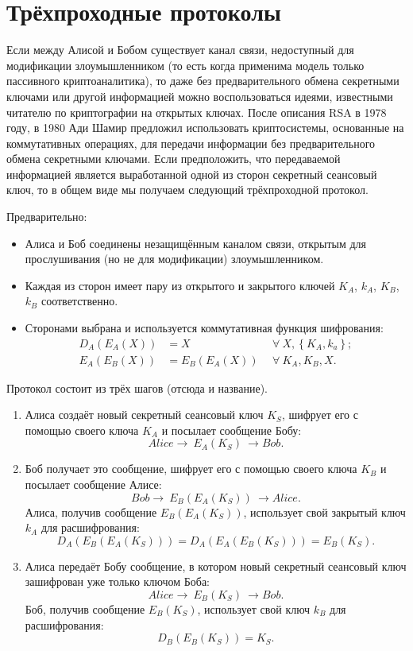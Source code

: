 \section{Трёхпроходные протоколы}

Если между Алисой и Бобом существует канал связи, недоступный для модификации злоумышленником (то есть когда применима модель только пассивного криптоаналитика), то даже без предварительного обмена секретными ключами или другой информацией можно воспользоваться идеями, известными читателю по криптографии на открытых ключах. После описания RSA в 1978 году, в 1980 Ади Шамир предложил использовать криптосистемы, основанные на коммутативных операциях, для передачи информации без предварительного обмена секретными ключами. Если предположить, что передаваемой информацией является выработанной одной из сторон секретный сеансовый ключ, то в общем виде мы получаем следующий трёхпроходной протокол.

Предварительно:

\begin{itemize}
	\item Алиса и Боб соединены незащищённым каналом связи, открытым для прослушивания (но не для модификации) злоумышленником.
	\item Каждая из сторон имеет пару из открытого и закрытого ключей $K_A$, $k_A$, $K_B$, $k_B$ соответственно.
	\item Сторонами выбрана и используется коммутативная функция шифрования:
	\begin{align*}
		D_{A} \left( E_{A} \left( X \right) \right)	&= X		& ~~\forall ~ X, \left\{ K_A, k_a \right\}; \\
		E_{A} \left( E_{B} \left( X \right) \right)	&= E_B \left( E_A \left( X \right) \right) & ~~\forall ~ K_A, K_B, X.
	\end{align*}
\end{itemize}

Протокол состоит из трёх шагов (отсюда и название).
\begin{enumerate}
    \item Алиса создаёт новый секретный сеансовый ключ $K_S$, шифрует его с помощью своего ключа $K_A$ и посылает сообщение Бобу:
        \[ Alice \rightarrow ~ E_A \left( K_S \right) ~ \rightarrow Bob. \]
    \item Боб получает это сообщение, шифрует его с помощью своего ключа $K_B$ и посылает сообщение Алисе:
        \[ Bob \rightarrow ~ E_B \left( E_A \left( K_S \right) \right) ~ \rightarrow Alice. \]
    Алиса, получив сообщение $E_B \left( E_A \left( K_S \right) \right)$, использует свой закрытый ключ $k_A$ для расшифрования:
	\[ D_A \left( E_B \left( E_A \left( K_S \right) \right) \right) = D_A \left( E_A \left( E_B \left( K_S \right) \right) \right) = E_B \left( K_S \right). \]
    \item Алиса передаёт Бобу сообщение, в котором новый секретный сеансовый ключ зашифрован уже только ключом Боба:
        \[ Alice \rightarrow ~ E_B \left( K_S \right) ~ \rightarrow Bob. \]
    Боб, получив сообщение $E_B \left( K_S \right)$, использует свой ключ $k_B$ для расшифрования:
	\[ D_B \left( E_B \left( K_S \right) \right) = K_S. \]
\end{enumerate}

